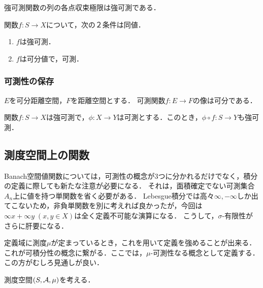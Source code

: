 \documentclass[uplatex,dvipdfmx]{jsreport}
\begin{document}
\begin{corollary}
    強可測関数の列の各点収束極限は強可測である．
\end{corollary}

\begin{corollary}
    関数$f:S\to X$について，次の２条件は同値．
    \begin{enumerate}
        \item $f$は強可測．
        \item $f$は可分値で，可測．
    \end{enumerate}
\end{corollary}

\subsubsection{可測性の保存}

\begin{lemma}
    $E$を可分距離空間，$F$を距離空間とする．
    可測関数$f:E\to F$の像は可分である．
\end{lemma}

\begin{corollary}
    関数$f:S\to X$は強可測で，$\phi:X\to Y$は可測とする．このとき，$\phi\circ f:S\to Y$も強可測．
\end{corollary}

\subsection{測度空間上の関数}

\begin{tcolorbox}[colframe=ForestGreen, colback=ForestGreen!10!white,breakable,colbacktitle=ForestGreen!40!white,coltitle=black,fonttitle=\bfseries\sffamily,
title=]
    Banach空間値関数については，可測性の概念が3つに分かれるだけでなく，積分の定義に際しても新たな注意が必要になる．
    それは，面積確定でない可測集合$A_n$上に値を持つ単関数を省く必要がある．
    Lebesgue積分では高々$\infty,-\infty$しか出てこないため，非負単関数を別に考えれば良かったが，今回は$\infty x+\infty y\;(x,y\in X)$は全く定義不可能な演算になる．
    こうして，$\sigma$-有限性がさらに肝要になる．

    定義域に測度$\mu$が定まっているとき，これを用いて定義を強めることが出来る．
    これが可積分性の概念に繋がる．ここでは，$\mu$-可測性なる概念として定義する．
    この方がむしろ見通しが良い．
\end{tcolorbox}

\begin{notation}
    測度空間$(S,\mathcal{A},\mu)$を考える．
\end{notation}
\end{document}
